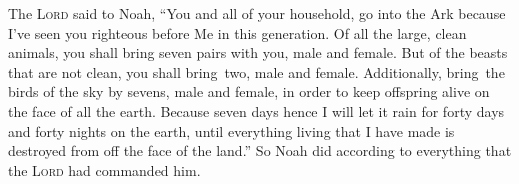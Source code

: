 
\begin{inparaenum}
   The \textsc{Lord} said to Noah, ``You and all of your household, go into the Ark because I've seen you righteous before Me in this generation.%
   Of all the large, clean animals, you shall bring seven pairs with you, male and female. But of the beasts that are not clean, you shall bring\understood\ two, male and female.%
   Additionally, bring\understood\ the birds of the sky by sevens, male and female, in order to keep offspring alive on the face of all the earth.%
   Because seven days hence I will let it rain for forty days and forty nights on the earth, until everything living that I have made is destroyed from off the face of the land.''%
   So Noah did according to everything that the \textsc{Lord} had commanded him.%
  

\end{inparaenum}
